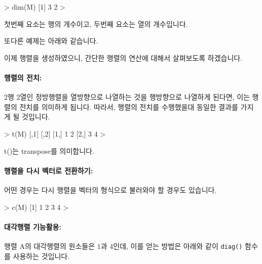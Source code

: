 \documentclass{book}
\begin{document}
\begin{Schunk}
\begin{Soutput}
> dim(M)
[1] 3 2
>
\end{Soutput}
\end{Schunk}

첫번째 요소는 행의 개수이고, 두번째 요소는 열의 개수입니다. 

또다른 예제는 아래와 같습니다. 

\begin{Schunk}
\end{Schunk}

이제 행렬을 생성하였으니, 간단한 행렬의 연산에 대해서 살펴보도록 하겠습니다. 

\paragraph{행렬의 전치: }
2행 2열인 정방행렬을 열방향으로 나열하는 것을 행방향으로 나열하게 된다면, 이는 행렬의 전치를 의미하게 됩니다. 
따라서, 행렬의 전치를 수행했을대 동일한 결과를 가지게 될 것입니다. 

\begin{Schunk}
\begin{Soutput}

> t(M)
     [,1] [,2]
[1,]    1    2
[2,]    3    4
> 
\end{Soutput}
\end{Schunk}

t()는 transpose를 의미합니다.

\paragraph{행렬을 다시 벡터로 전환하기:}
어떤 경우는 다시 행렬을 벡터의 형식으로 불러와야 할 경우도 있습니다. 

\begin{Schunk}
\begin{Soutput}
> c(M)
[1] 1 2 3 4
> 
\end{Soutput}
\end{Schunk}


\paragraph{대각행렬 기능활용: } 행렬 A의 대각행렬의 원소들은 $1$과 $4$인데, 이를 얻는 방법은 아래와 같이 \texttt{diag()} 함수를 사용하는 것입니다. 
\end{document}
